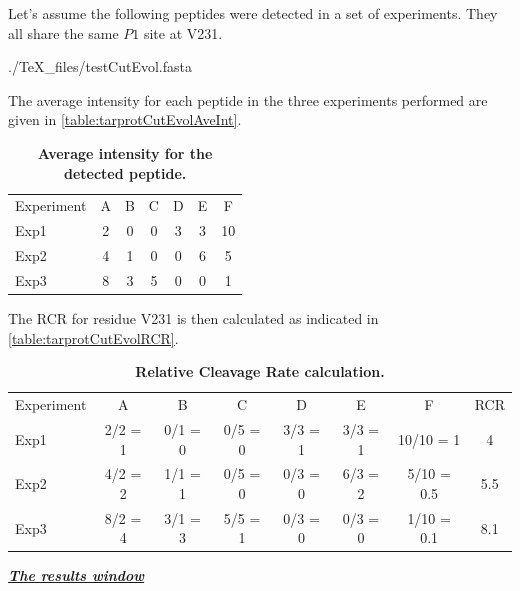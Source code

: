 Let's assume the following peptides were detected in a set of experiments. They all
share the same \(P1\) site at V231.

\begin{texshade}{./TeX_files/testCutEvol.fasta}
    \hideconsensus
\end{texshade}

The average intensity for each peptide in the three experiments performed are given
in \autoref{table:tarprotCutEvolAveInt}.

\begin{table}[h!]
    \centering
    \begin{tabular}{lcccccc}
        \hline
        Experiment & A & B & C & D & E & F \\
        Exp1 & 2 & 0 & 0 & 3 & 3 & 10 \\
        Exp2 & 4 & 1 & 0 & 0 & 6 & 5 \\
        Exp3 & 8 & 3 & 5 & 0 & 0 & 1 \\
        \hline
    \end{tabular}
    \caption[Average intensity for the detected peptide]{\textbf{Average intensity
    for the detected peptide.}}
    \label{table:tarprotCutEvolAveInt}
\end{table}

The RCR for residue V231 is then calculated as indicated in \autoref{table:tarprotCutEvolRCR}.

\begin{table}[h!]
    \centering
    \begin{tabular}{lccccccc}
        \hline
        Experiment & A       & B       & C       & D       & E       & F          & RCR\\
        Exp1       & 2/2 = 1 & 0/1 = 0 & 0/5 = 0 & 3/3 = 1 & 3/3 = 1 & 10/10 = 1  & 4  \\
        Exp2       & 4/2 = 2 & 1/1 = 1 & 0/5 = 0 & 0/3 = 0 & 6/3 = 2 & 5/10 = 0.5 & 5.5\\
        Exp3       & 8/2 = 4 & 3/1 = 3 & 5/5 = 1 & 0/3 = 0 & 0/3 = 0 & 1/10 = 0.1 & 8.1\\
        \hline
    \end{tabular}
    \caption[Relative Cleavage Rate calculation]{\textbf{Relative Cleavage Rate
    calculation.}}
    \label{table:tarprotCutEvolRCR}
\end{table}

\textit{\textbf{\underline{The results window}}}

